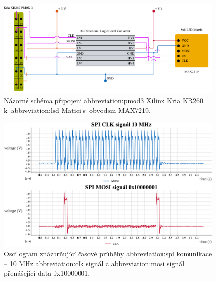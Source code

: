 \documentclass[a4paper, twoside, 11pt]{article}
\begin{document}
	\begin{figure}[htbp!]
		\centering
		\includegraphics[width=1\textwidth]{src/pdf/spi-test-connection.pdf}
		\caption{Názorné schéma připojení \gls{abbreviation:pmod}3 Xilinx Kria KR260 k~\gls{abbreviation:led} Matici s~obvodem MAX7219.}
		\label{fig:spi-test-connection}
	\end{figure}

	\begin{figure}[htbp!]
		\centering
		\includegraphics[width=1\textwidth]{src/python-graph/spi-osciloscope-data/pdf/clk-data-full-graph.pdf}
		\caption{Oscilogram znázorňující časové průběhy \gls{abbreviation:spi} komunikace – 10 MHz \gls{abbreviation:clk} signál a \gls{abbreviation:mosi} signál přenášející data 0x10000001.}
		\label{fig:clk-data-full-graph}
	\end{figure}
\end{document}
